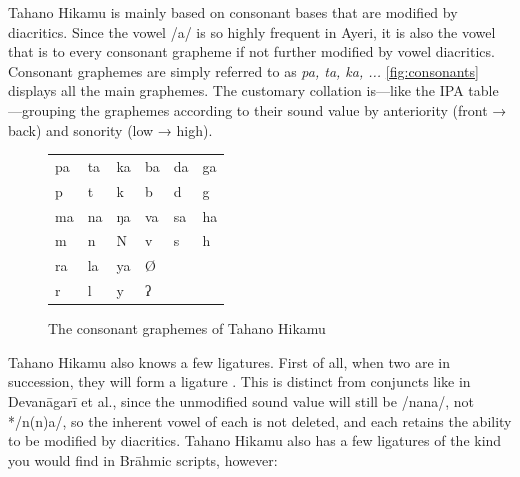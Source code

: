 Tahano Hikamu is mainly based on consonant bases that are modified by 
diacritics. Since the vowel /a/ is so highly frequent in Ayeri, it is also the 
vowel that is  to every consonant grapheme if not further modified 
by vowel diacritics. Consonant graphemes are simply referred to as \textit{pa, 
ta, ka, ...} \autoref{fig:consonants} displays all the main graphemes. The 
customary collation is---like the IPA table---grouping the graphemes 
according to their sound value by anteriority (front → back) and sonority (low 
→ high).


\begin{figure}[ht]
\caption{The consonant graphemes of Tahano Hikamu}

\begin{tabu} to \linewidth{X[c] X[c] X[c] X[c] X[c] X[c]}
\toprule
\tableheaderfont	pa & ta & ka & ba & da & ga \\
\rowfont{\Tagati\huge}	p & t & k & b & d & g \\

\midrule

\tableheaderfont	ma & na & ŋa & va & sa & ha \\
\rowfont{\Tagati\huge}	m & n & N & v & s & h \\

\midrule

\tableheaderfont	ra & la & ya & Ø \\
\rowfont{\Tagati\huge}	r & l & y & ʔ \\

\bottomrule
\end{tabu}
\label{fig:thcons}
\end{figure}

Tahano Hikamu also knows a few ligatures. First of all, when two  
 are in succession, they will form a ligature  . 
This is distinct from conjuncts like in Devanāgarī et al., since the unmodified 
sound value will still be /nana/, not */n(n)a/, so the inherent vowel of each 
  is not deleted, and each   retains the ability 
to be modified by diacritics. Tahano Hikamu also has a few ligatures of the kind 
you would find in Brāhmic scripts, however:

